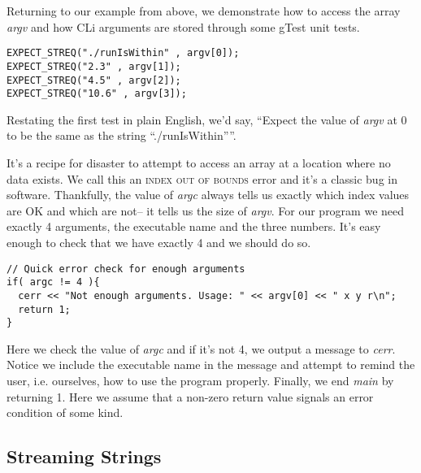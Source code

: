 \documentclass[]{tufte-handout}
\begin{document}
Returning to our example from above, we demonstrate how to access the array \textit{argv} and how CLi arguments are stored through some gTest unit tests.
\begin{verbatim}
EXPECT_STREQ("./runIsWithin" , argv[0]);
EXPECT_STREQ("2.3" , argv[1]);
EXPECT_STREQ("4.5" , argv[2]);
EXPECT_STREQ("10.6" , argv[3]);
\end{verbatim}
Restating the first test in plain English, we'd say, ``Expect the value of \textit{argv} at 0 to be the same as the string ``./runIsWithin''''. 

It's a recipe for disaster to attempt to access an array at a location where no data exists. We call this an \textsc{index out of bounds} error and it's a classic bug in software.  Thankfully, the value of \textit{argc} always tells us exactly which index values are OK and which are not-- it tells us the size of \textit{argv}. For our program we need exactly 4 arguments, the executable name and the three numbers. It's easy enough to check that we have exactly 4 and we should do so. 
\begin{verbatim}
// Quick error check for enough arguments
if( argc != 4 ){
  cerr << "Not enough arguments. Usage: " << argv[0] << " x y r\n";
  return 1;
}
\end{verbatim}
Here we check the value of \textit{argc} and if it's not 4, we output a message to \textit{cerr}. Notice we include the executable name in the message and attempt to remind the user, i.e. ourselves, how to use the program properly. Finally, we end \textit{main} by returning 1. Here we assume that a non-zero return value signals an error condition of some kind. 

\subsection{Streaming Strings}
\end{document}
